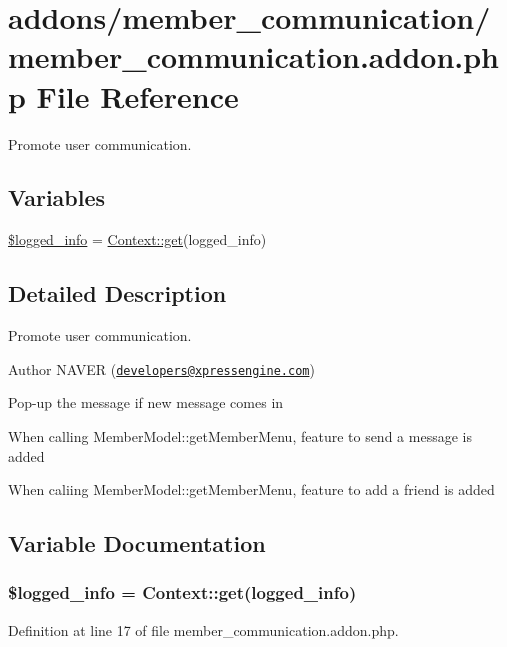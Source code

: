 \hypertarget{member__communication_8addon_8php}{}\section{addons/member\+\_\+communication/member\+\_\+communication.addon.\+php File Reference}
\label{member__communication_8addon_8php}


Promote user communication.  


\subsection*{Variables}
\begin{DoxyCompactItemize}
\item 
\hyperlink{member__communication_8addon_8php_a193c1593ceb216e9fb05b0bad01ebbc8}{\$logged\+\_\+info} = \hyperlink{classContext_a90ce25d65fe6c9778421cbb36ab3def5}{Context\+::get}(\textquotesingle{}logged\+\_\+info\textquotesingle{})
\end{DoxyCompactItemize}


\subsection{Detailed Description}
Promote user communication. 

\begin{DoxyAuthor}{Author}
N\+A\+V\+ER (\href{mailto:developers@xpressengine.com}{\tt developers@xpressengine.\+com})
\begin{DoxyItemize}
\item Pop-\/up the message if new message comes in
\item When calling Member\+Model\+::get\+Member\+Menu, feature to send a message is added
\item When caliing Member\+Model\+::get\+Member\+Menu, feature to add a friend is added 
\end{DoxyItemize}
\end{DoxyAuthor}


\subsection{Variable Documentation}
\subsubsection[{\texorpdfstring{\$logged\+\_\+info}{$logged_info}}]{\setlength{\rightskip}{0pt plus 5cm}\$logged\+\_\+info = {\bf Context\+::get}(\textquotesingle{}logged\+\_\+info\textquotesingle{})}\hypertarget{member__communication_8addon_8php_a193c1593ceb216e9fb05b0bad01ebbc8}{}\label{member__communication_8addon_8php_a193c1593ceb216e9fb05b0bad01ebbc8}


Definition at line 17 of file member\+\_\+communication.\+addon.\+php.

